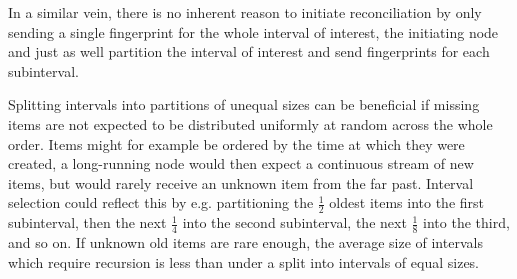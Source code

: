 In a similar vein, there is no inherent reason to initiate reconciliation by only sending a single fingerprint for the whole interval of interest, the initiating node and just as well partition the interval of interest and send fingerprints for each subinterval.

Splitting intervals into partitions of unequal sizes can be beneficial if missing items are not expected to be distributed uniformly at random across the whole order. Items might for example be ordered by the time at which they were created, a long-running node would then expect a continuous stream of new items, but would rarely receive an unknown item from the far past. Interval selection could reflect this by e.g. partitioning the $\frac{1}{2}$ oldest items into the first subinterval, then the next $\frac{1}{4}$ into the second subinterval, the next $\frac{1}{8}$ into the third, and so on. If unknown old items are rare enough, the average size of intervals which require recursion is less than under a split into intervals of equal sizes.

